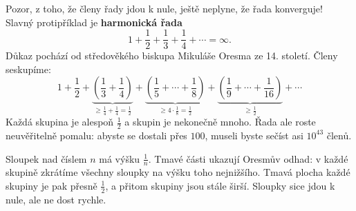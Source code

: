 \begin{note}\label{note:harmonicka-rada}
  Pozor, z toho, že členy řady jdou k nule, ještě neplyne, že řada konverguje! Slavný protipříklad je \textbf{harmonická řada}
  \begin{equation*}
    1 + \frac{1}{2} + \frac{1}{3} + \frac{1}{4} + \cdots = \infty.
  \end{equation*}
  Důkaz pochází od středověkého biskupa Mikuláše Oresma ze 14. století. Členy seskupíme:
  \begin{equation*}
    1 + \frac{1}{2} + \underbrace{\left(\frac{1}{3} + \frac{1}{4}\right)}_{\geq\frac{1}{4} + \frac{1}{4} = \frac{1}{2}} + \underbrace{\left(\frac{1}{5} + \cdots + \frac{1}{8}\right)}_{\geq 4\cdot\frac{1}{8} = \frac{1}{2}} + \underbrace{\left(\frac{1}{9} + \cdots + \frac{1}{16}\right)}_{\geq\frac{1}{2}} + \cdots
  \end{equation*}
  Každá skupina je alespoň $\frac{1}{2}$ a skupin je nekonečně mnoho. Řada ale roste neuvěřitelně pomalu: abyste se dostali přes $100$, museli byste sečíst asi $10^{43}$ členů.

  \begin{center}
  \end{center}
  Sloupek nad číslem $n$ má výšku $\frac{1}{n}$. Tmavé části ukazují Oresmův odhad: v každé skupině zkrátíme všechny sloupky na výšku toho nejnižšího. Tmavá plocha každé skupiny je pak přesně $\frac{1}{2}$, a přitom skupiny jsou stále širší. Sloupky sice jdou k nule, ale ne dost rychle.
\end{note}

